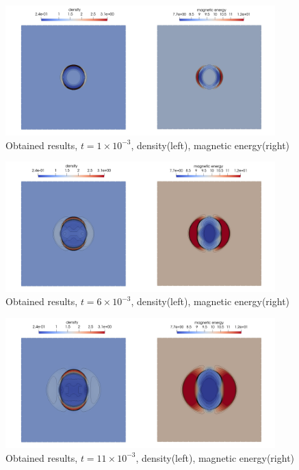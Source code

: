 \vspace{-5mm}
\begin{figure}[H]
	\begin{center}
		\includegraphics[width=0.93\textwidth]{img/mhd-blast/old/mynew1.jpg}
	\caption{Obtained results, $t = 1\times 10^{-3}$, density(left), magnetic energy(right)}
	\label{figure:blastOldMy1}
	\end{center}
\end{figure}
\vspace{-8mm}

\begin{figure}[H]
	\begin{center}
		\includegraphics[width=0.93\textwidth]{img/mhd-blast/old/mynew2.jpg}
	\caption{Obtained results, $t = 6\times 10^{-3}$, density(left), magnetic energy(right)}
	\label{figure:blastOldMy2}
	\end{center}
\end{figure}
\vspace{-8mm}

\begin{figure}[H]
	\begin{center}
		\includegraphics[width=0.93\textwidth]{img/mhd-blast/old/mynew3.jpg}
	\caption{Obtained results, $t = 11\times 10^{-3}$, density(left), magnetic energy(right)}
	\label{figure:blastOldMy3}
	\end{center}
\end{figure}
\vspace{-8mm}


